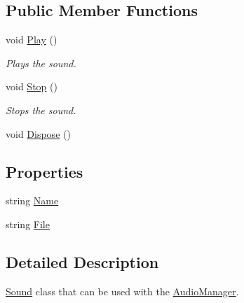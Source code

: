 \subsection*{Public Member Functions}
\begin{DoxyCompactItemize}
\item 
void \hyperlink{class_tri_devs_1_1_tri_engine2_d_1_1_audio_1_1_sound_ac3c5f503b38724749891c2e80452b507}{Play} ()
\begin{DoxyCompactList}\small\item\em Plays the sound. \end{DoxyCompactList}\item 
void \hyperlink{class_tri_devs_1_1_tri_engine2_d_1_1_audio_1_1_sound_a438bcba9d063d1aff5329a2c4f8354b0}{Stop} ()
\begin{DoxyCompactList}\small\item\em Stops the sound. \end{DoxyCompactList}\item 
void \hyperlink{class_tri_devs_1_1_tri_engine2_d_1_1_audio_1_1_sound_ad77df80da5230fd51a494372387edd4f}{Dispose} ()
\end{DoxyCompactItemize}
\subsection*{Properties}
\begin{DoxyCompactItemize}
\item 
string \hyperlink{class_tri_devs_1_1_tri_engine2_d_1_1_audio_1_1_sound_aa229d7b8273ba4b1077ed9279d726b87}{Name}
\item 
string \hyperlink{class_tri_devs_1_1_tri_engine2_d_1_1_audio_1_1_sound_acdc085b638bf51a4d395b8e88281f6eb}{File}
\end{DoxyCompactItemize}


\subsection{Detailed Description}
\hyperlink{class_tri_devs_1_1_tri_engine2_d_1_1_audio_1_1_sound}{Sound} class that can be used with the \hyperlink{class_tri_devs_1_1_tri_engine2_d_1_1_audio_1_1_audio_manager}{Audio\-Manager}. 



